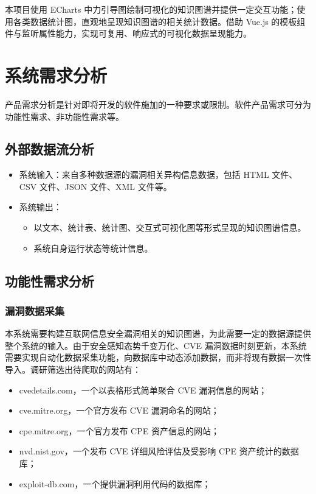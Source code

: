 \documentclass[a4paper,AutoFakeBold,oneside,12pt]{book}
\begin{document}
本项目使用 ECharts 中力引导图绘制可视化的知识图谱并提供一定交互功能；使用各类数据统计图，直观地呈现知识图谱的相关统计数据。借助 Vue.js 的模板组件与监听属性能力，实现可复用、响应式的可视化数据呈现能力。

\chapter{系统需求分析}

产品需求分析是针对即将开发的软件施加的一种要求或限制。软件产品需求可分为功能性需求、非功能性需求等。\cite{bourque_guide_2014}

\section{外部数据流分析}

\begin{itemize}
	\item 系统输入：来自多种数据源的漏洞相关异构信息数据，包括 HTML 文件、CSV 文件、JSON 文件、XML 文件等。
	\item 系统输出：
	      \begin{itemize}
		      \item 以文本、统计表、统计图、交互式可视化图等形式呈现的知识图谱信息。
		      \item 系统自身运行状态等统计信息。
	      \end{itemize}
\end{itemize}

\section{功能性需求分析}

\subsection{漏洞数据采集}

本系统需要构建互联网信息安全漏洞相关的知识图谱，为此需要一定的数据源提供整个系统的输入。由于安全感知态势千变万化、CVE 漏洞数据时刻更新，本系统需要实现自动化数据采集功能，向数据库中动态添加数据，而非将现有数据一次性导入。调研筛选出待爬取的网站有：
\begin{itemize}
	\item cvedetails.com，一个以表格形式简单聚合 CVE 漏洞信息的网站；
	\item cve.mitre.org，一个官方发布 CVE 漏洞命名的网站；
	\item cpe.mitre.org，一个官方发布 CPE 资产信息的网站；
	\item nvd.nist.gov，一个发布 CVE 详细风险评估及受影响 CPE 资产统计的数据库；
	\item exploit-db.com，一个提供漏洞利用代码的数据库；
\end{itemize}
\end{document}

